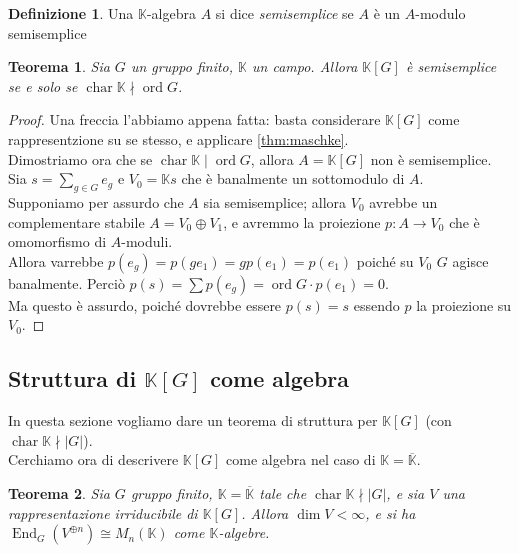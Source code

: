 \documentclass[11pt]{article}
\theoremstyle{plain}
\newtheorem{thm}{Teorema}[section]
\theoremstyle{definition}
\newtheorem{defn}{Definizione}[section]
\theoremstyle{remark}
\newcommand{\K}{\mathbb{K}}
\DeclareMathOperator{\End}{End}
\DeclareMathOperator{\Char}{char}
\DeclareMathOperator{\ord}{ord}
\begin{document}
   \begin{defn}
    Una $\K$-algebra $A$ si dice \emph{semisemplice} se $A$ è un $A$-modulo semisemplice
   \end{defn}
   \begin{thm}
    Sia $G$ un gruppo finito, $\K$ un campo. Allora $\K[G]$ è semisemplice se e solo se $\Char\K\nmid\ord G$.
   \end{thm}
   \begin{proof}
    Una freccia l'abbiamo appena fatta: basta considerare $\K[G]$ come rappresentzione su se stesso, e applicare \ref{thm:maschke}.\\
    Dimostriamo ora che se $\Char\K\mid\ord G$, allora $A=\K[G]$ non è semisemplice.
    Sia $s=\sum_{g\in G}e_g$ e $V_0=\K s$ che è banalmente un sottomodulo di $A$.\\
    Supponiamo per assurdo che $A$ sia semisemplice; allora $V_0$ avrebbe un complementare stabile $A=V_0\oplus V_1$, e avremmo la proiezione $p:A\to V_0$ che è omomorfismo di $A$-moduli.\\
    Allora varrebbe $p(e_g)=p(ge_1)=gp(e_1)=p(e_1)$ poiché su $V_0$ $G$ agisce banalmente. Perciò $p(s)=\sum p(e_g)=\ord G\cdot p(e_1)=0$.\\
    Ma questo è assurdo, poiché dovrebbe essere $p(s)=s$ essendo $p$ la proiezione su $V_0$.
    
   \end{proof}




\subsection{Struttura di $\K[G]$ come algebra}
In questa sezione vogliamo dare un teorema di struttura per $\K[G]$ (con $\Char \K  \nmid |G|$).\\
Cerchiamo ora di descrivere $\K[G]$ come algebra nel caso di $\K=\overline{\K}$.
\begin{thm}\label{thm:end_matrici}
	Sia $G$ gruppo finito, $\K=\overline{\K}$ tale che $\Char \K \nmid |G|$, e sia $V$ una rappresentazione irriducibile di $\K[G]$. Allora $\dim V <\infty$, e si ha $\End_G(V^{\oplus n}) \cong M_n(\K)$ come $\K$-algebre.
\end{thm}
\end{document}
